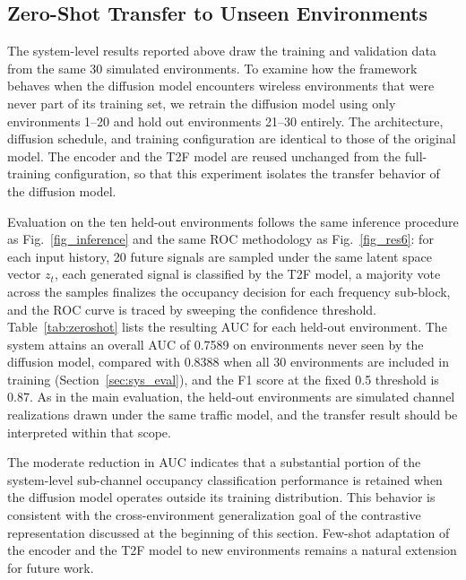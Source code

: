 \documentclass[lettersize,journal]{IEEEtran}
\begin{document}
\subsection{Zero-Shot Transfer to Unseen Environments}\label{sec:zeroshot}

The system-level results reported above draw the training and validation data from the same 30 simulated environments. To examine how the framework behaves when the diffusion model encounters wireless environments that were never part of its training set, we retrain the diffusion model using only environments 1--20 and hold out environments 21--30 entirely. The architecture, diffusion schedule, and training configuration are identical to those of the original model. The encoder and the T2F model are reused unchanged from the full-training configuration, so that this experiment isolates the transfer behavior of the diffusion model.

Evaluation on the ten held-out environments follows the same inference procedure as Fig.~\ref{fig_inference} and the same ROC methodology as Fig.~\ref{fig_res6}: for each input history, 20 future signals are sampled under the same latent space vector $z_t$, each generated signal is classified by the T2F model, a majority vote across the samples finalizes the occupancy decision for each frequency sub-block, and the ROC curve is traced by sweeping the confidence threshold. Table~\ref{tab:zeroshot} lists the resulting AUC for each held-out environment. The system attains an overall AUC of 0.7589 on environments never seen by the diffusion model, compared with 0.8388 when all 30 environments are included in training (Section~\ref{sec:sys_eval}), and the F1 score at the fixed 0.5 threshold is 0.87. As in the main evaluation, the held-out environments are simulated channel realizations drawn under the same traffic model, and the transfer result should be interpreted within that scope.

The moderate reduction in AUC indicates that a substantial portion of the system-level sub-channel occupancy classification performance is retained when the diffusion model operates outside its training distribution. This behavior is consistent with the cross-environment generalization goal of the contrastive representation discussed at the beginning of this section. Few-shot adaptation of the encoder and the T2F model to new environments remains a natural extension for future work.
\end{document}
